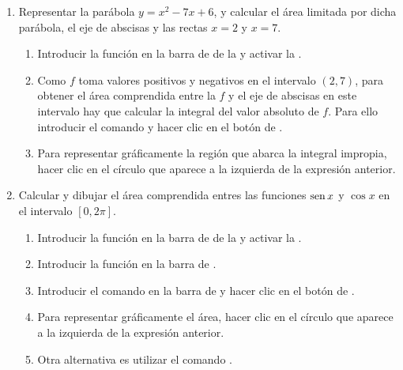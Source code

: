\begin{enumerate}[leftmargin=*]
\item Representar la parábola $y=x^{2}-7x+6$, y calcular el área limitada por dicha parábola, el eje de abscisas y las rectas $x=2$ y $x=7$.
      \begin{indication}
      \begin{enumerate}
      \item Introducir la función  en la barra de  de la  y activar la .
      \item Como $f$ toma valores positivos y negativos en el intervalo $(2,7)$, para obtener el área comprendida entre la $f$ y el eje de abscisas en este intervalo hay que calcular la integral del valor absoluto de $f$.
            Para ello introducir el comando  y hacer clic en el botón de .
      \item Para representar gráficamente la región que abarca la integral impropia, hacer clic en el círculo que aparece a la izquierda de la expresión anterior.
      \end{enumerate}
      \end{indication}


\item Calcular y dibujar el área comprendida entres las funciones $\operatorname{sen} x$ y $\cos x$ en el intervalo $[0,2\pi]$.
      \begin{indication}
      \begin{enumerate}
      \item Introducir la función  en la barra de  de la  y activar la .
      \item Introducir la función  en la barra de .
      \item Introducir el comando  en la barra de  y hacer clic en el botón de .
      \item Para representar gráficamente el área, hacer clic en el círculo que aparece a la izquierda de la expresión anterior.
      \item Otra alternativa es utilizar el comando .
      \end{enumerate}
      \end{indication}



\end{enumerate}
